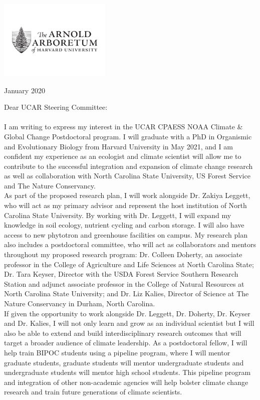 \documentclass[11pt,a4paper]{letter}\usepackage[]{graphicx}\usepackage[]{color}
\begin{document}
\begin{letter}{}


\includegraphics[width=0.4\textwidth]{AA_logo.jpg}
\begin{flushright}
 January 2020\\
\end{flushright}
\noindent Dear UCAR Steering Committee:\\ %
\vspace{1ex}\\
\noindent I am writing to express my interest in the UCAR CPAESS NOAA Climate \& Global Change Postdoctoral program. I will graduate with a PhD in Organismic and Evolutionary Biology from Harvard University in May 2021, and I am confident my experience as an ecologist and climate scientist will allow me to contribute to the successful integration and expansion of climate change research as well as collaboration with North Carolina State University, US Forest Service and The Nature Conservancy. \\

\noindent As part of the proposed research plan, I will work alongside Dr. Zakiya Leggett, who will act as my primary advisor and represent the host institution of North Carolina State University. By working with Dr. Leggett, I will expand my knowledge in soil ecology, nutrient cycling and carbon storage. I will also have access to new phytotron and greenhouse facilities on campus. My research plan also includes a postdoctoral committee, who will act as collaborators and mentors throughout my proposed research program: Dr. Colleen Doherty, an associate professor in the College of Agriculture and Life Sciences at North Carolina State; Dr. Tara Keyser, Director with the USDA Forest Service Southern Research Station and adjunct associate professor in the College of Natural Resources at North Carolina State University; and Dr. Liz Kalies, Director of Science at The Nature Conservancy in Durham, North Carolina. \\

\noindent If given the opportunity to work alongside Dr. Leggett, Dr. Doherty, Dr. Keyser and Dr. Kalies, I will not only learn and grow as an individual scientist but I will also be able to extend and build interdisciplinary research outcomes that will target a broader audience of climate leadership. As a postdoctoral fellow, I will help train BIPOC students using a pipeline program, where I will mentor graduate students, graduate students will mentor undergraduate students and undergraduate students will mentor high school students. This pipeline program and integration of other non-academic agencies will help bolster climate change research and train future generations of climate scientists.  \\


\end{letter}
\end{document}

